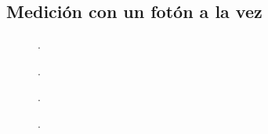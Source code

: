 \documentclass[%
 reprint,
 amsmath,amssymb,
 aps,
]{revtex4-1}
\begin{document}
\subsection{Medición con un fotón a la vez}
\begin{figure}[ht]
\caption{\label{fotomultiplicador} .}
\end{figure}
\begin{figure}[ht]
\caption{\label{distribucion} .}
\end{figure}
\begin{figure}[ht]
\caption{\label{promedios_std} .}
\end{figure}
\begin{figure}[ht]
\caption{\label{interferencia_laserverde} .}
\end{figure}
\end{document}
